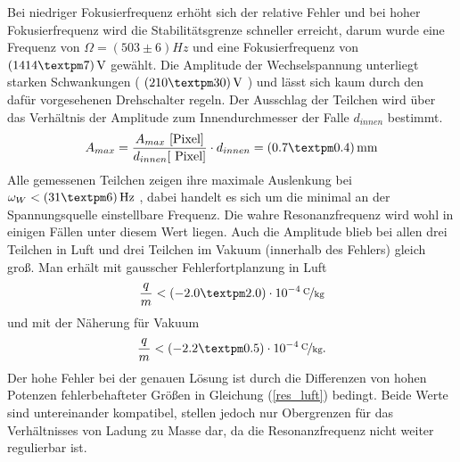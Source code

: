 \documentclass[a4paper,12pt]{article}
\begin{document}
Bei niedriger Fokusierfrequenz erhöht sich der relative Fehler und bei hoher Fokusierfrequenz wird die Stabilitätsgrenze schneller erreicht,
darum wurde eine Frequenz von $Ω = (503±6)\unit{Hz}$ und eine Fokusierfrequenz von $\unit[(1414±7)]{V}$ gewählt.
Die Amplitude der Wechselspannung unterliegt starken Schwankungen
( $ \unit[( 210 ± 30 )]{V} $ )
und lässt sich kaum durch den dafür vorgesehenen Drehschalter regeln.
Der Ausschlag der Teilchen wird über das Verhältnis der Amplitude zum Innendurchmesser der Falle $d_{innen}$ bestimmt.
$$A_{max} = \frac{A_{max}\text{ [Pixel]}}{d_{innen}\text{[ Pixel]}} \cdot d_{innen}= \unit[( 0.7 ± 0.4 )]{mm} $$
Alle gemessenen Teilchen zeigen ihre maximale Auslenkung bei $\omega_W < \unit[(31±6)]{Hz}$ ,
dabei handelt es sich um die minimal an der Spannungsquelle einstellbare Frequenz.
Die wahre Resonanzfrequenz wird wohl in einigen Fällen unter diesem Wert liegen.
Auch die Amplitude blieb bei allen drei Teilchen in Luft und drei Teilchen im Vakuum (innerhalb des Fehlers) gleich groß.
Man erhält mit gausscher Fehlerfortplanzung in Luft
$$\frac{q}{m} < \unitfrac[( -2.0 ± 2.0 ) \cdot 10^{-4}]{C}{kg}$$
und mit der Näherung für Vakuum
$$\frac{q}{m} < \unitfrac[( -2.2 ± 0.5 ) \cdot 10^{-4}]{C}{kg}.$$
Der hohe Fehler bei der genauen Lösung ist durch die Differenzen von hohen Potenzen fehlerbehafteter Größen in Gleichung (\ref{res_luft}) bedingt.
Beide Werte sind untereinander kompatibel, stellen jedoch nur Obergrenzen für das Verhältnisses von Ladung zu Masse dar, da die Resonanzfrequenz nicht weiter regulierbar ist.

\end{document}
